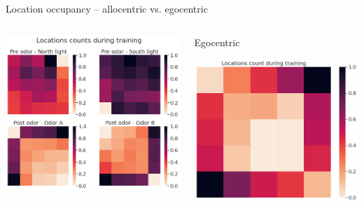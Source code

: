 \documentclass[bigger]{beamer}
\begin{document}
\begin{frame}[label={sec:orge387630}]{Location occupancy -- allocentric vs. egocentric}
\begin{columns}
\begin{column}{0.5\columnwidth}
\begin{center}
\includegraphics[width=.9\linewidth]{img/q-learning_allo_locations_count_all_steps_by_cues.png}
\end{center}
\end{column}
\begin{column}{0.5\columnwidth}
\footnotesize
\center
\vspace{-1em}
Egocentric
\vspace{-1em}
\begin{center}
\includegraphics[height=0.2\textheight]{img/q-learning_ego_locations_count_all_steps_all_cues.png}
\end{center}


\end{column}
\end{columns}
\end{frame}
\end{document}
